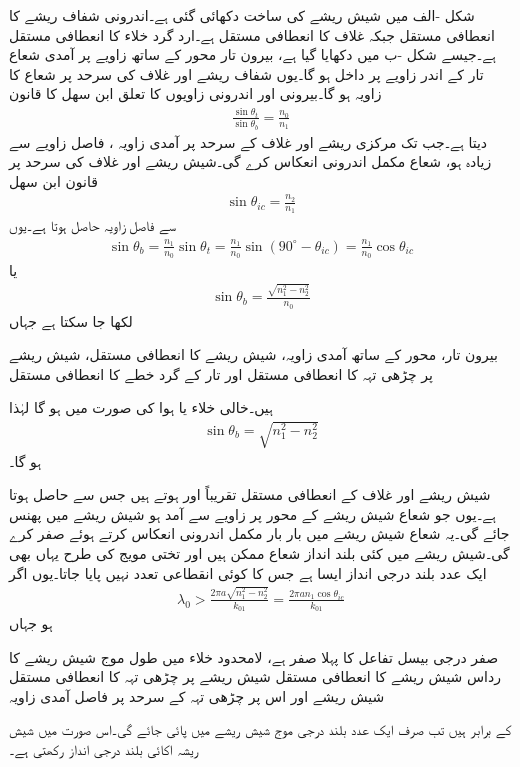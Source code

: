 شکل -الف میں شیش ریشے کی ساخت دکھائی گئی ہے۔اندرونی شفاف ریشے کا  انعطافی مستقل  جبکہ غلاف کا  انعطافی مستقل  ہے۔ارد گرد خلاء کا  انعطافی مستقل  ہے۔جیسے شکل -ب میں دکھایا گیا ہے، بیرون تار محور کے ساتھ  زاویے پر آمدی شعاع تار کے اندر  زاویے پر داخل ہو گا۔یوں شفاف ریشے اور غلاف کی سرحد پر شعاع کا زاویہ  ہو گا۔بیرونی اور اندرونی زاویوں کا تعلق ابن سھل کا قانون
\begin{align}
\frac{\sin \theta_t}{\sin \theta_b}=\frac{n_0}{n_1}
\end{align}
دیتا ہے۔جب تک مرکزی ریشے اور غلاف کے سرحد پر آمدی زاویہ ، فاصل زاویے  سے زیادہ ہو، شعاع مکمل اندرونی انعکاس کرے گی۔شیش ریشے اور غلاف کی سرحد پر قانون ابن سھل
\begin{align}
\sin{\theta_{ic}}=\frac{n_2}{n_1}
\end{align}
 سے فاصل زاویہ  حاصل ہوتا ہے۔یوں
\begin{align*}
\sin \theta_b=\frac{n_1}{n_0} \sin \theta_t =\frac{n_1}{n_0} \sin(90^{\circ}-\theta_{ic})=\frac{n_1}{n_0} \cos \theta_{ic}
\end{align*}
یا
\begin{align}
\sin \theta_b=\frac{\sqrt{n_1^2-n_2^2}}{n_0}
\end{align}
لکھا جا سکتا ہے جہاں
\begin{description}
 بیرون تار، محور کے ساتھ آمدی زاویہ،
 شیش ریشے کا  انعطافی مستقل،
 شیش ریشے پر چڑھی تہہ کا  انعطافی مستقل اور
 تار کے گرد خطے کا  انعطافی مستقل
\end{description}
ہیں۔خالی خلاء یا ہوا کی صورت میں  ہو گا لہٰذا
\begin{align}
\sin \theta_b=\sqrt{n_1^2-n_2^2}
\end{align}
ہو گا۔

شیش ریشے اور غلاف کے  انعطافی مستقل تقریباً  اور  ہوتے ہیں جس سے  حاصل ہوتا ہے۔یوں جو شعاع شیش ریشے کے محور پر  زاویے سے آمد ہو شیش ریشے میں پھنس جائے گی۔یہ شعاع شیش ریشے میں بار بار مکمل اندرونی انعکاس کرتے ہوئے صفر کرے گی۔شیش ریشے میں کئی بلند انداز شعاع ممکن ہیں اور تختی مویج کی طرح یہاں بھی ایک عدد بلند درجی انداز ایسا ہے جس کا کوئی انقطاعی تعدد نہیں پایا جاتا۔یوں اگر
\begin{align}
\lambda_0>\frac{2\pi a \sqrt{n_1^2-n_2^2}}{k_{01}}=\frac{2\pi a n_1 \cos \theta_{ic}}{k_{01}}
\end{align}
ہو جہاں
\begin{description}
 صفر درجی بیسل تفاعل  کا پہلا صفر  ہے،
 لامحدود خلاء میں طول موج
 شیش ریشے کا رداس
 شیش ریشے کا  انعطافی مستقل
 شیش ریشے پر چڑھی تہہ کا  انعطافی مستقل
 شیش ریشے اور اس پر چڑھی تہہ کے سرحد پر فاصل آمدی زاویہ
\end{description}
کے برابر ہیں تب صرف ایک عدد بلند درجی موج شیش ریشے میں پائی جائے گی۔اس صورت میں شیش ریشہ اکائی بلند درجی انداز رکھتی ہے۔

